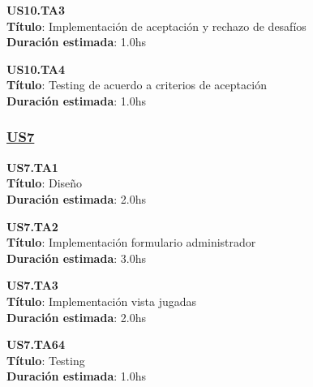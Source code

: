 \begin{tcolorbox}
\textbf{US10.TA3} \\
\textbf{Título}: Implementación de aceptación  y rechazo de desafíos \\
\textbf{Duración estimada}: 1.0hs
\end{tcolorbox}
\vspace{10pt}

\begin{tcolorbox}
\textbf{US10.TA4} \\
\textbf{Título}: Testing de acuerdo a criterios de aceptación \\
\textbf{Duración estimada}: 1.0hs
\end{tcolorbox}
\vspace{10pt}



\subsubsection*{\underline{US7}}

\begin{tcolorbox}
\textbf{US7.TA1} \\
\textbf{Título}: Diseño \\
\textbf{Duración estimada}: 2.0hs
\end{tcolorbox}
\vspace{10pt}

\begin{tcolorbox}
\textbf{US7.TA2} \\
\textbf{Título}: Implementación formulario administrador \\
\textbf{Duración estimada}: 3.0hs
\end{tcolorbox}
\vspace{10pt}

\begin{tcolorbox}
\textbf{US7.TA3} \\
\textbf{Título}: Implementación vista jugadas \\
\textbf{Duración estimada}: 2.0hs
\end{tcolorbox}
\vspace{10pt}

\begin{tcolorbox}
\textbf{US7.TA64} \\
\textbf{Título}: Testing \\
\textbf{Duración estimada}: 1.0hs
\end{tcolorbox}
\vspace{10pt}

